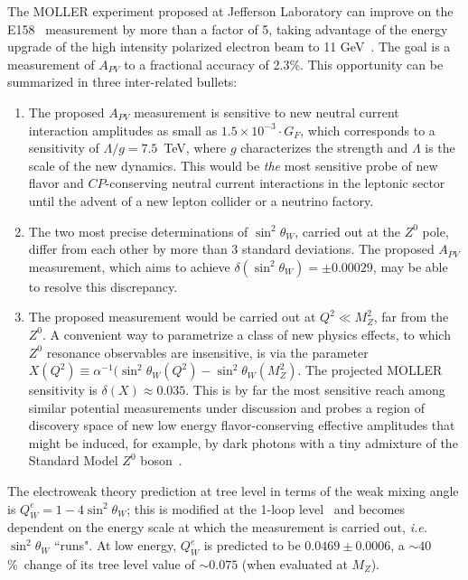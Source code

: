 The MOLLER experiment proposed at Jefferson Laboratory can improve on the E158~\cite{ref:cl:Anthony:2005pm}
measurement by more than a factor of 5, taking advantage of the energy upgrade of the high intensity
polarized electron beam to 11 GeV~\cite{ref:cl:Dudek:2012vr}. The goal is a measurement of $A_{PV}$ to a fractional accuracy
of 2.3\%. 
This opportunity can be summarized in three inter-related bullets:
\begin{enumerate}
\item The proposed $A_{PV}$ measurement is sensitive to new neutral current interaction amplitudes as 
small as $1.5\times 10^{-3}\cdot G_F$, which corresponds to a sensitivity of $\Lambda/g =  7.5$~TeV, where $g$ characterizes the strength and $\Lambda$ is the
scale of the new dynamics. This would be {\it the} most sensitive probe of new flavor and $C\!P$-conserving 
neutral current interactions in the leptonic sector until the advent of a new lepton collider or a neutrino factory. 
\item  The two most precise determinations of 
$\sin^2\theta_W$, carried out at the $Z^0$ pole, differ from each other by more than 3 standard deviations. 
The proposed $A_{PV}$ measurement, which aims to achieve
$\delta(\sin^2\theta_W) = \pm 0.00029$, may be able to resolve this discrepancy.
\item The proposed measurement would be carried out at $Q^2\ll M_Z^2$, far from the $Z^0$. A 
convenient way to parametrize a class of new physics effects, to which $Z^0$ resonance observables are 
insensitive, is via the parameter 
$X(Q^2)\equiv\alpha^{-1}(\sin^2\theta_W(Q^2)-\sin^2\theta_W(M_Z^2)$. The projected MOLLER sensitivity is 
$\delta(X)\approx 0.035$. This is by far the most sensitive reach among similar potential
measurements under discussion and probes a region of discovery space of new low
energy flavor-conserving effective amplitudes that might be induced, for example, by dark photons with 
a tiny admixture of the Standard Model $Z^0$ boson~\cite{ref:cl:darkz}. 
\end{enumerate}

The electroweak theory prediction at tree level in terms of the weak mixing angle is $Q^e_W = 1 - 4\sin^2\theta_W$; 
this is modified at the 1-loop level~\cite{ref:cl:Czarnecki:1995fw, ref:cl:Czarnecki:2000ic, ref:cl:Erler:2004in} and
becomes dependent on the energy scale at which the measurement is carried out, {\em i.e.} $\sin^2\theta_W$
``runs". At low energy, $Q^e_W$  is predicted to be 
$0.0469\pm 0.0006$, a $\sim 40$\%\ change of its tree level value of $\sim 0.075$ (when evaluated at $M_Z$).

